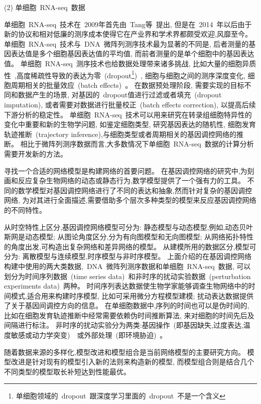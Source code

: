 (2) 单细胞~RNA-seq~数据

单细胞~RNA-seq~技术在~2009年首先由~Tang等~\cite{tang2009mrna}提出,
但是在~2014~年以后由于新的协议和相对低廉的测序成本使得它在产业界和学术界都颇受欢迎,风靡至今。
单细胞~RNA-seq~技术与~DNA~微阵列测序技术最为显著的不同是,
后者测量的基因表达值是多个细胞基因表达值的平均值,
而前者测量的是单个细胞中的基因表达值。
单细胞~RNA-seq~测序技术也给数据处理带来诸多挑战,
比如大量的细胞异质性~\cite{wagner2016revealing},高度稀疏性导致的表达为零~(dropout\footnote{单细胞领域的~dropout~跟深度学习里面的~dropout~不是一个含义})~\cite{vallejos2017normalizing}, 细胞与细胞之间的测序深度变化, 细胞周期相关的批量效应~(batch effects)~\cite{buettner2015computational}。
在数据预处理阶段, 需要实现的目标不同和数据产生的场景, 对基因的~dropout值进行过滤或者填充~(dropout imputation), 或者需要对数据进行批量校正~(batch effects correction), 以提高后续下游分析的稳定性。
单细胞~RNA-seq~技术可以用来研究在转录组细胞特异性的变化中重要和新的生物学问题,
如鉴定细胞类型, 研究基因表达的随机性, 细胞发育轨迹推断~(trajectory inference),与细胞类型或者周期相关的基因调控网络的推断。
相比于微阵列测序数据而言,大多数情况下单细胞~RNA-seq~数据的计算分析需要开发新的方法。

寻找一个合适的网络模型是构建网络的首要问题。
在基因调控网络的研究中,为刻画和反应复杂生物网络的动态或静态行为,数学模型提供了一个强有力的工具。
不同的数学模型对基因调控网络进行了不同的表达和抽象,然而针对复杂的基因调控网络,
为对其进行全面描述,需要借助多个层次多种类型的模型来反应基因调控网络的不同特性。

从时空特性上区分,基因调控网络模型可分为:
静态模型与动态模型,例如,动态贝叶斯网是动态模型;
从图论角度区分,分为有向图模型和无向图模型;
从网络拓扑特性的角度出发,可构造出复杂网络和差异网络的模型。 
从建模所用的数据区分,模型可分为:
离散模型与连续模型,时序模型与非时序模型。
上面介绍的在基因调控网络构建中使用的两大类数据,~DNA~微阵列测序数据和单细胞~RNA-seq~数据, 
可以划分为时间序列数据~(time series data)~和非时序的扰动实验数据~(perturbation experiments data)~两种。
时间序列表达数据使生物学家能够调查生物网络中的时间模式,适合用来构建时序模型, 比如可采用微分方程模型建模; 
扰动表达数据提供了关于基因间调控方向的信息。
在单细胞数据中,序列的时间也可以是伪时间的, 比如在细胞发育轨迹推断中经常需要依赖伪时间推断算法, 来对细胞的时间先后及间隔进行标注。
非时序的扰动实验分为两类:基因操作~(即基因缺失,过度表达,温度敏感或动力学突变)~\cite{holstege1998dissecting}~或外部处理~(即环境胁迫)~\cite{gasch2000genomic}。

随着数据来源的多样化,模型改进和模型组合是当前网络模型的主要研究方向。
模型改进是针对现有的模型引入新的法则来构造新的模型,
而模型组合则是结合几个不同类型的模型取长补短达到性能最优。

